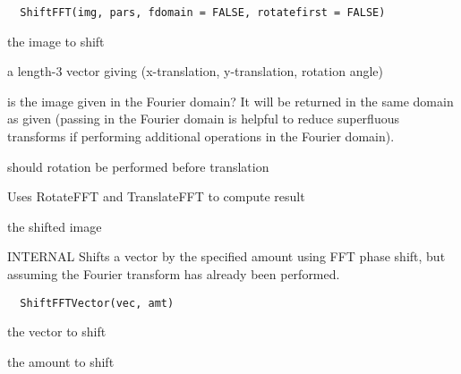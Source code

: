 \documentclass[a4paper]{book}
\begin{document}
%
\begin{Usage}
\begin{verbatim}
  ShiftFFT(img, pars, fdomain = FALSE, rotatefirst = FALSE)
\end{verbatim}
\end{Usage}
%
\begin{Arguments}
\begin{ldescription}
\item[\code{img}] the image to shift

\item[\code{pars}] a length-3 vector giving (x-translation,
y-translation, rotation angle)

\item[\code{fdomain}] is the image given in the Fourier domain?
It will be returned in the same domain as given (passing
in the Fourier domain is helpful to reduce superfluous
transforms if performing additional operations in the
Fourier domain).

\item[\code{rotatefirst}] should rotation be performed before
translation
\end{ldescription}
\end{Arguments}
%
\begin{Details}\relax
Uses RotateFFT and TranslateFFT to compute result
\end{Details}
%
\begin{Value}
the shifted image
\end{Value}
%
\begin{Description}\relax
INTERNAL Shifts a vector by the specified amount using
FFT phase shift, but assuming the Fourier transform has
already been performed.
\end{Description}
%
\begin{Usage}
\begin{verbatim}
  ShiftFFTVector(vec, amt)
\end{verbatim}
\end{Usage}
%
\begin{Arguments}
\begin{ldescription}
\item[\code{vec}] the vector to shift

\item[\code{amt}] the amount to shift
\end{ldescription}
\end{Arguments}
\end{document}

